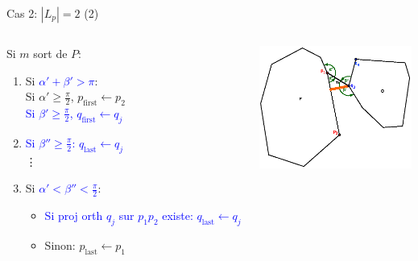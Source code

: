 \documentclass{beamer}
\begin{document}
\begin{frame}{Cas 2: $|L_p| = 2$ (2)}
	\begin{columns}[c]
	\begin{column}[T]{.5\textwidth}
		Si $m$ sort de $P$:
		\begin{enumerate}
		\item Si \textcolor{blue}{$\alpha' + \beta' > \pi$}: \\
			\hspace{0.3cm} Si $\alpha' \geq \frac{\pi}{2}$, $p_{\text{first}} \leftarrow p_{2}$\\
			\hspace{0.3cm} \textcolor{blue}{Si $\beta' \geq \frac{\pi}{2}$, $q_{\text{first}} \leftarrow q_{j}$}
		\item \textcolor{blue}{Si $\beta'' \geq \frac{\pi}{2}$: $q_{\text{last}} \leftarrow q_{j}$} \\ 
			\hspace{0.5cm} \vdots
		\item Si \textcolor{blue}{$\alpha' < \beta'' < \frac{\pi}{2}$}:
			\begin{itemize}
			\item \textcolor{blue}{Si proj orth $q_{j}$ sur $p_{1}p_{2}$ existe: $q_{\text{last}} \leftarrow q_{j}$}
			\item Sinon: $p_{\text{last}} \leftarrow p_{\text{1}}$
			\end{itemize}
		\end{enumerate}
	\end{column}
	\begin{column}[T]{.5\textwidth}
		\includegraphics[width=5cm]{dmin2_5.eps}
	\end{column}
	\end{columns}
\end{frame}
\end{document}
